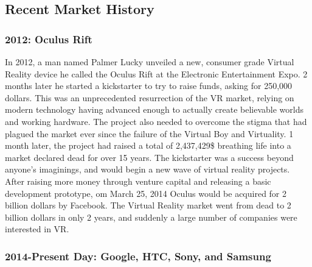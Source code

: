 \documentclass[a4paper,10pt]{article}
\begin{document}
\pagebreak

\subsection{Recent Market History}

\subsubsection{2012: Oculus Rift}

In 2012, a man named Palmer Lucky unveiled a new, consumer grade Virtual Reality device he called the Oculus Rift at the Electronic Entertainment Expo.  2 months later he started a kickstarter to try to raise funds, asking for 250,000 dollars.  This was an unprecedented resurrection of the VR market, relying on modern technology having advanced enough to actually create believable worlds and working hardware.  The project also needed to overcome the stigma that had plagued the market ever since the failure of the Virtual Boy and Virtuality.  1 month later, the project had raised a total of 2,437,429\$ breathing life into a market declared dead for over 15 years.  The kickstarter was a success beyond anyone's imaginings, and would begin a new wave of virtual reality projects.  After raising more money through venture capital and releasing a basic development prototype, om March 25, 2014 Oculus would be acquired for 2 billion dollars by Facebook.  The Virtual Reality market went from dead to 2 billion dollars in only 2 years, and suddenly a large number of companies were interested in VR.

\subsubsection{2014-Present Day: Google, HTC, Sony, and Samsung}
\end{document}
